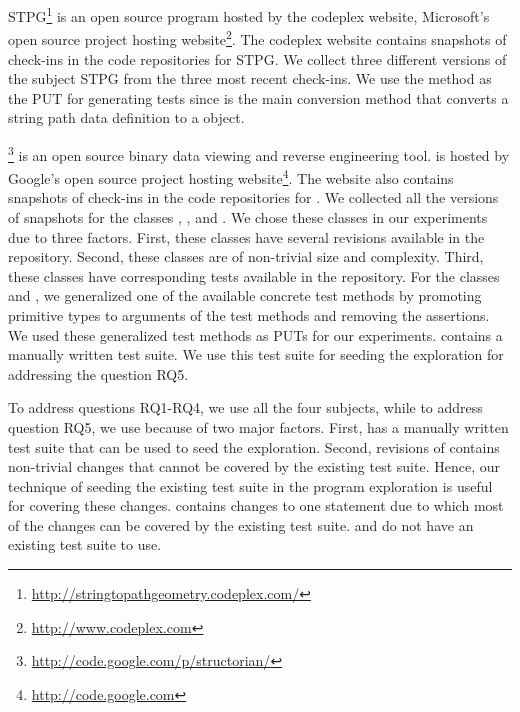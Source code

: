 STPG\footnote{\url{http://stringtopathgeometry.codeplex.com/}} is an open source program hosted by the codeplex website, Microsoft's open source project hosting website\footnote{\url{http://www.codeplex.com}}. The codeplex website contains snapshots of check-ins in the code repositories for STPG. We collect three different versions of the subject STPG from the three most recent check-ins. We use the  method as the PUT for generating tests since  is the main conversion method that converts a string path data definition to a  object.

\footnote{\url{http://code.google.com/p/structorian/}} is an open source binary data viewing and reverse engineering tool.  is hosted by Google's open source project hosting website\footnote{\url{http://code.google.com}}. The website also contains snapshots of check-ins in the code repositories for . We collected all the versions of snapshots for the classes , , and . We chose these classes in our experiments due to three factors. First, these classes have several revisions available in the repository. Second, these classes are of non-trivial size and complexity. Third, these classes have corresponding tests available in the repository. For the classes  and  , we generalized one of the available concrete test methods by promoting primitive types to arguments of the test methods and removing the assertions.  We used these generalized test methods as PUTs for our experiments.  contains a manually written test suite. We use this test suite for seeding the exploration for addressing the question RQ5.

To address questions RQ1-RQ4, we use all the four subjects, while to address question RQ5, we use  because of two major factors. First,  has a manually written test suite that can be used to seed the exploration. Second, revisions of  contains non-trivial changes that cannot be covered by the existing test suite. Hence, our technique of seeding the existing test suite in the program exploration is useful for covering these changes.  contains changes to one statement due to which most of the changes can be covered by the existing test suite.  and  do not have an existing test suite to use.

